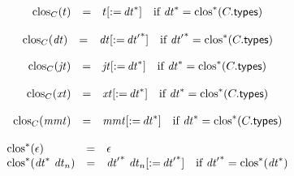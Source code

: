 \vspace{1ex}

$$
\begin{array}[t]{@{}lcl@{}l@{}}
{{\mathrm{clos}}}_{C}(t) & = & {t}{{}[ {:=}\, {{\mathit{dt}}^\ast} ]} & \quad \mbox{if}~ {{\mathit{dt}}^\ast} = {{{\mathrm{clos}}^\ast}}{(C{.}\mathsf{types})} \\
\end{array}
$$

$$
\begin{array}[t]{@{}lcl@{}l@{}}
{{\mathrm{clos}}}_{C}({\mathit{dt}}) & = & {{\mathit{dt}}}{{}[ {:=}\, {{\mathit{dt}'}^\ast} ]} & \quad \mbox{if}~ {{\mathit{dt}'}^\ast} = {{{\mathrm{clos}}^\ast}}{(C{.}\mathsf{types})} \\
\end{array}
$$

$$
\begin{array}[t]{@{}lcl@{}l@{}}
{{\mathrm{clos}}}_{C}({\mathit{jt}}) & = & {{\mathit{jt}}}{{}[ {:=}\, {{\mathit{dt}}^\ast} ]} & \quad \mbox{if}~ {{\mathit{dt}}^\ast} = {{{\mathrm{clos}}^\ast}}{(C{.}\mathsf{types})} \\
\end{array}
$$

$$
\begin{array}[t]{@{}lcl@{}l@{}}
{{\mathrm{clos}}}_{C}({\mathit{xt}}) & = & {{\mathit{xt}}}{{}[ {:=}\, {{\mathit{dt}}^\ast} ]} & \quad \mbox{if}~ {{\mathit{dt}}^\ast} = {{{\mathrm{clos}}^\ast}}{(C{.}\mathsf{types})} \\
\end{array}
$$

$$
\begin{array}[t]{@{}lcl@{}l@{}}
{{\mathrm{clos}}}_{C}({\mathit{mmt}}) & = & {{\mathit{mmt}}}{{}[ {:=}\, {{\mathit{dt}}^\ast} ]} & \quad \mbox{if}~ {{\mathit{dt}}^\ast} = {{{\mathrm{clos}}^\ast}}{(C{.}\mathsf{types})} \\
\end{array}
$$

$$
\begin{array}[t]{@{}lcl@{}l@{}}
{{{\mathrm{clos}}^\ast}}{(\epsilon)} & = & \epsilon \\
{{{\mathrm{clos}}^\ast}}{({{\mathit{dt}}^\ast}~{\mathit{dt}}_n)} & = & {{\mathit{dt}'}^\ast}~{{\mathit{dt}}_n}{{}[ {:=}\, {{\mathit{dt}'}^\ast} ]} & \quad \mbox{if}~ {{\mathit{dt}'}^\ast} = {{{\mathrm{clos}}^\ast}}{({{\mathit{dt}}^\ast})} \\
\end{array}
$$

